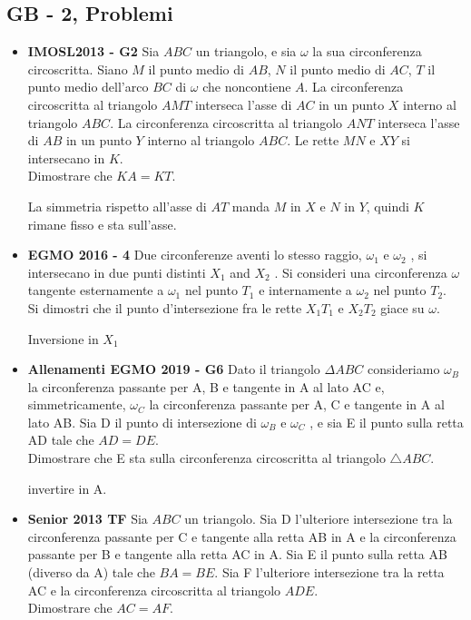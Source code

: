 \subsection{GB - 2, Problemi}
 \begin{itemize}
    \item \textbf{IMOSL2013 - G2}  Sia $ABC$ un triangolo, e sia $\omega$ la sua circonferenza circoscritta.  Siano $M$ il punto medio di $AB$, $N$ il punto medio di $AC$, $T$ il punto medio dell’arco $BC$ di $\omega$ che noncontiene $A$. La circonferenza circoscritta al triangolo $AMT$ interseca l’asse di $AC$ in un punto $X$ interno al triangolo $ABC$. La circonferenza circoscritta al triangolo $ANT$ interseca l’asse di $AB$ in un punto $Y$ interno al triangolo $ABC$. Le rette $MN$ e $XY$ si intersecano in $K$.\\
    Dimostrare che $KA=KT$.
    
    \begin{sol}La simmetria rispetto all'asse di $AT$ manda $M$ in $X$ e $N$ in $Y$, quindi $K$ rimane fisso e sta sull'asse.
    \end{sol}
    
    \item \textbf{EGMO 2016 - 4} Due circonferenze aventi lo stesso raggio, $\omega_1$ e $\omega_2$ , si intersecano in due punti distinti $X_1$ and $X_2$ . Si consideri una circonferenza $\omega$ tangente esternamente a $\omega_1$ nel punto $T_1$ e internamente a $\omega_2$ nel punto $T_2$.\\ Si dimostri che il punto d’intersezione fra le rette $X_1T_1$ e $X_2T_2$ giace su $\omega$.
    \begin{sol}
    Inversione in $X_1$
    \end{sol}
    
    \item \textbf{Allenamenti EGMO 2019 - G6}
    Dato il triangolo $\Delta ABC$ consideriamo $\omega_B$ la circonferenza passante per A, B e tangente in A al lato AC e, simmetricamente, $\omega_C$ la circonferenza passante per A, C e tangente in A al lato AB. Sia D il punto di intersezione di $\omega_B$ e $\omega_C$ , e sia E il punto sulla retta AD tale che $AD = DE$.\\
    Dimostrare che E sta sulla circonferenza circoscritta al triangolo $\triangle ABC$.

    \begin{sol}
    invertire in A.
    \end{sol}

    \item \textbf{Senior 2013 TF}
    Sia $ABC$ un triangolo. Sia D l’ulteriore intersezione tra la circonferenza passante per C e tangente alla retta AB in A e la circonferenza passante per B e tangente alla retta AC in A.
    Sia E il punto sulla retta AB (diverso da A) tale che $BA = BE$. Sia F l’ulteriore intersezione tra la retta AC e la circonferenza circoscritta al triangolo $ADE$.\\
    Dimostrare che $AC = AF$.


\end{itemize}
